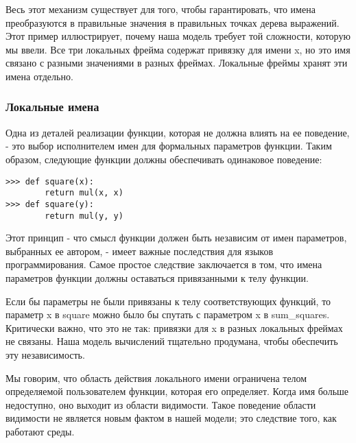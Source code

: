 Весь этот механизм существует для того, чтобы гарантировать, что имена преобразуются в правильные значения в правильных точках дерева выражений.
Этот пример иллюстрирует, почему наша модель требует той сложности, которую мы ввели.
Все три локальных фрейма содержат привязку для имени x, но это имя связано с разными значениями в разных фреймах. Локальные фреймы хранят эти имена отдельно.

\subsubsection{Локальные имена}
Одна из деталей реализации функции, которая не должна влиять на ее поведение, - это выбор исполнителем имен для формальных параметров функции. Таким образом, следующие функции должны обеспечивать одинаковое поведение:
\begin{verbatim}
>>> def square(x):
        return mul(x, x)
>>> def square(y):
        return mul(y, y)
\end{verbatim}

Этот принцип - что смысл функции должен быть независим от имен параметров, выбранных ее автором, - имеет важные последствия для языков программирования.
Самое простое следствие заключается в том, что имена параметров функции должны оставаться привязанными к телу функции.

Если бы параметры не были привязаны к телу соответствующих функций, то параметр x в square можно было бы спутать с параметром x в sum_squares.
Критически важно, что это не так: привязки для x в разных локальных фреймах не связаны. Наша модель вычислений тщательно продумана, чтобы обеспечить эту независимость.

Мы говорим, что область действия локального имени ограничена телом определяемой пользователем функции, которая его определяет.
Когда имя больше недоступно, оно выходит из области видимости. Такое поведение области видимости не является новым фактом в нашей модели; это следствие того, как работают среды.

